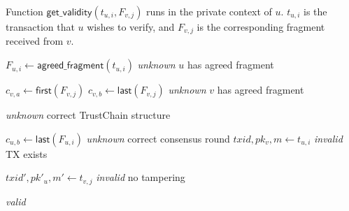 \begin{algorithm}
\caption{Function $\textsf{get\_validity}(t_{u, i}, F_{v, j})$ runs in the private context of $u$.
$t_{u, i}$ is the transaction that $u$ wishes to verify, and $F_{v, j}$ is the corresponding fragment received from $v$.}
\label{alg:get-validity}

\begin{algorithmic}[1]

    \State $F_{u, i} \gets \textsf{agreed\_fragment}(t_{u, i})$
        \State \Return \emph{unknown}
    \EndIf \Comment $u$ has agreed fragment
    \State 

    \State $c_{v, a} \gets \textsf{first}(F_{v, j})$
    \State $c_{v, b} \gets \textsf{last}(F_{v, j})$
        \State \Return \emph{unknown}
    \EndIf \Comment $v$ has agreed fragment
    \State 

            \State \Return \emph{unknown}
        \EndIf
    \EndIf \Comment correct TrustChain structure
    \State

    \State $c_{u, b} \gets \textsf{last}(F_{u, i})$
        \State \Return \emph{unknown}
    \EndIf \Comment correct consensus round
    \State
    \label{line:valid-fragment}
    \State $txid, pk_v, m \gets t_{u, i}$
        \State \Return \emph{invalid}
    \EndIf \Comment TX exists
    \State 

    \State $txid', pk'_u, m' \gets t_{v, j}$
        \State \Return \emph{invalid}
    \EndIf \Comment no tampering
    \State

    \State \Return \emph{valid}
\end{algorithmic}
\end{algorithm}

